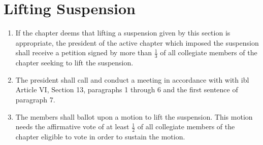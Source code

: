 \section{Lifting Suspension}
	
	\begin{enumerate}
		\item If the chapter deems that lifting a suspension given by this section is appropriate, the president of the active chapter which imposed the suspension shall receive a petition signed by more than $\frac{1}{3}$ of all collegiate members of the chapter seeking to lift the suspension.
		\item The president shall call and conduct a meeting in accordance with with \gls{ibl} Article VI, Section 13, paragraphs 1 through 6 and the first sentence of paragraph 7.
		\item The members shall ballot upon a motion to lift the suspension. This motion needs the affirmative vote of at least $\frac{1}{2}$ of all collegiate members of the chapter eligible to vote in order to sustain the motion.
	\end{enumerate}


